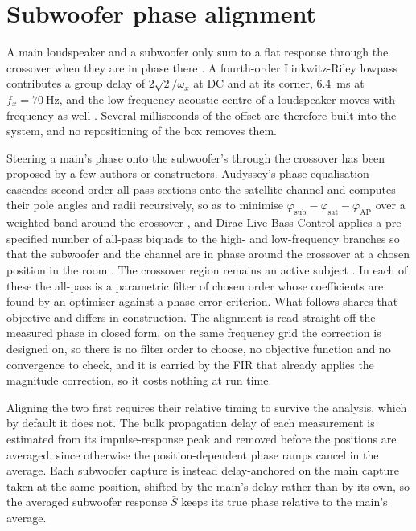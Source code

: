 \documentclass[10pt,a4paper]{article}
\begin{document}
\section{Subwoofer phase alignment}\label{sec:subalign}

A main loudspeaker and a subwoofer only sum to a flat response through the crossover when they are in phase there \cite{Linkwitz1976}. A fourth-order Linkwitz-Riley lowpass contributes a group delay of $2\sqrt{2}/\omega_x$ at DC and at its corner, \SI{6.4}{\milli\second} at $f_x=\SI{70}{\hertz}$, and the low-frequency acoustic centre of a loudspeaker moves with frequency as well \cite{Vanderkooy2006}. Several milliseconds of the offset are therefore built into the system, and no repositioning of the box removes them.

Steering a main's phase onto the subwoofer's through the crossover has been proposed by a few authors or constructors. Audyssey's phase equalisation cascades second-order all-pass sections onto the satellite channel and computes their pole angles and radii recursively, so as to minimise $\varphi_{\mathrm{sub}}-\varphi_{\mathrm{sat}}-\varphi_{\mathrm{AP}}$ over a weighted band around the crossover \cite{Bharitkar2010, BharitkarBook}, and Dirac Live Bass Control applies a pre-specified number of all-pass biquads to the high- and low-frequency branches so that the subwoofer and the channel are in phase around the crossover at a chosen position in the room \cite{DiracBass}. The crossover region remains an active subject \cite{Kim2025}. In each of these the all-pass is a parametric filter of chosen order whose coefficients are found by an optimiser against a phase-error criterion. What follows shares that objective and differs in construction. The alignment is read straight off the measured phase in closed form, on the same frequency grid the correction is designed on, so there is no filter order to choose, no objective function and no convergence to check, and it is carried by the FIR that already applies the magnitude correction, so it costs nothing at run time.

Aligning the two first requires their relative timing to survive the analysis, which by default it does not. The bulk propagation delay of each measurement is estimated from its impulse-response peak and removed before the positions are averaged, since otherwise the position-dependent phase ramps cancel in the average. Each subwoofer capture is instead delay-anchored on the main capture taken at the same position, shifted by the main's delay rather than by its own, so the averaged subwoofer response $\bar S$ keeps its true phase relative to the main's average.
\end{document}
